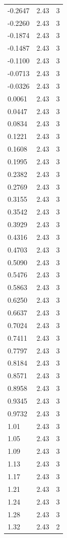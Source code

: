 \begin{longtable}{lrr}
  -0.2647 & 2.43 & 3 \\
  -0.2260 & 2.43 & 3 \\
  -0.1874 & 2.43 & 3 \\
  -0.1487 & 2.43 & 3 \\
  -0.1100 & 2.43 & 3 \\
  -0.0713 & 2.43 & 3 \\
  -0.0326 & 2.43 & 3 \\
  0.0061 & 2.43 & 3 \\
  0.0447 & 2.43 & 3 \\
  0.0834 & 2.43 & 3 \\
  0.1221 & 2.43 & 3 \\
  0.1608 & 2.43 & 3 \\
  0.1995 & 2.43 & 3 \\
  0.2382 & 2.43 & 3 \\
  0.2769 & 2.43 & 3 \\
  0.3155 & 2.43 & 3 \\
  0.3542 & 2.43 & 3 \\
  0.3929 & 2.43 & 3 \\
  0.4316 & 2.43 & 3 \\
  0.4703 & 2.43 & 3 \\
  0.5090 & 2.43 & 3 \\
  0.5476 & 2.43 & 3 \\
  0.5863 & 2.43 & 3 \\
  0.6250 & 2.43 & 3 \\
  0.6637 & 2.43 & 3 \\
  0.7024 & 2.43 & 3 \\
  0.7411 & 2.43 & 3 \\
  0.7797 & 2.43 & 3 \\
  0.8184 & 2.43 & 3 \\
  0.8571 & 2.43 & 3 \\
  0.8958 & 2.43 & 3 \\
  0.9345 & 2.43 & 3 \\
  0.9732 & 2.43 & 3 \\
  1.01 & 2.43 & 3 \\
  1.05 & 2.43 & 3 \\
  1.09 & 2.43 & 3 \\
  1.13 & 2.43 & 3 \\
  1.17 & 2.43 & 3 \\
  1.21 & 2.43 & 3 \\
  1.24 & 2.43 & 3 \\
  1.28 & 2.43 & 3 \\
  1.32 & 2.43 & 2 \\

\end{longtable}
